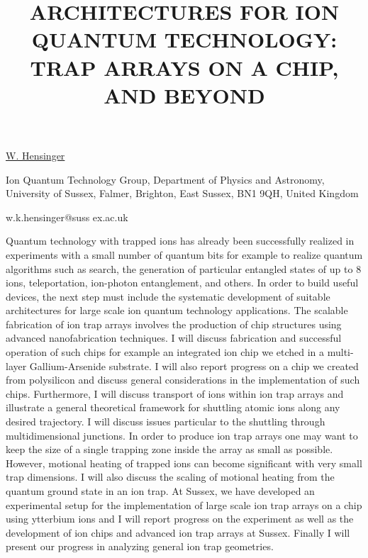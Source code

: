\title{ARCHITECTURES FOR ION QUANTUM TECHNOLOGY: TRAP ARRAYS ON A CHIP, AND BEYOND}

\underline{W. Hensinger} 

{\normalsize{\vspace{-4mm}
Ion Quantum Technology Group, Department of Physics and Astronomy,
University of Sussex, Falmer, Brighton, East Sussex, BN1 9QH, United
Kingdom

\email w.k.hensinger@suss ex.ac.uk}}

Quantum technology with trapped ions has already been successfully realized in experiments with a small number of quantum bits for example to realize quantum algorithms such as search, the generation of particular entangled states of up to 8 ions, teleportation, ion-photon entanglement, and others. In order to build useful devices, the next step must include the systematic development of suitable architectures for large scale ion quantum technology applications. The scalable fabrication of ion trap arrays involves the production of chip structures using advanced nanofabrication techniques. I will discuss fabrication and successful operation of such chips for example an integrated ion chip we etched in a multi-layer Gallium-Arsenide substrate. I will also report progress on a chip we created from polysilicon and discuss general considerations in the implementation of such chips. Furthermore, I will discuss transport of ions within ion trap arrays and illustrate a general theoretical framework for shuttling atomic ions along any desired trajectory. I will discuss issues particular to the shuttling through multidimensional junctions. In order to produce ion trap arrays one may want to keep the size of a single trapping zone inside the array as small as possible. However, motional heating of trapped ions can become significant with very small trap dimensions. I will also discuss the scaling of motional heating from the quantum ground state in an ion trap. At Sussex, we have developed an experimental setup for the implementation of large scale ion trap arrays on a chip using ytterbium ions and I will report progress on the experiment as well as the development of ion chips and advanced ion trap arrays at Sussex. Finally I will present our progress in analyzing general ion trap geometries.

\vspace{\baselineskip}